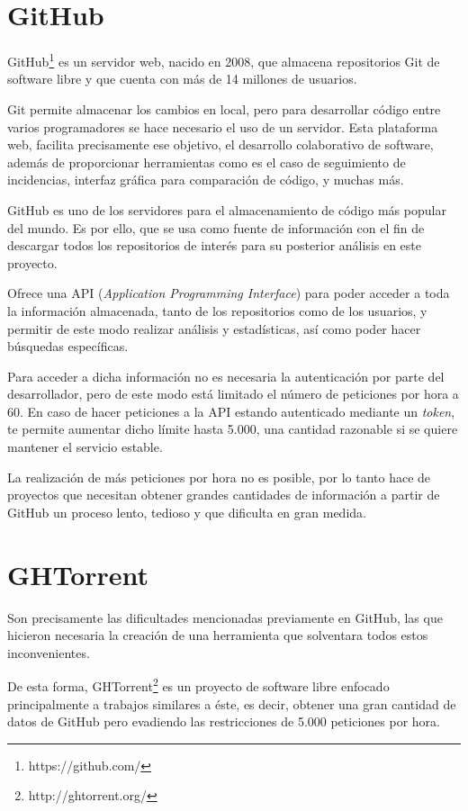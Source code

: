 \documentclass[a4paper, 12pt]{book}
\begin{document}
\section{GitHub} 
\label{sec:seccion6}
GitHub\footnote{https://github.com/} es un servidor web, nacido en 2008, que almacena repositorios Git de software libre y que cuenta con más de 14 millones de usuarios. 

Git permite almacenar los cambios en local, pero para desarrollar código entre varios programadores se hace necesario el uso de un servidor. Esta plataforma web, facilita precisamente ese objetivo, el desarrollo colaborativo de software, además de proporcionar herramientas como es el caso de seguimiento de incidencias, interfaz gráfica para comparación de código, y muchas más.

GitHub es uno de los servidores para el almacenamiento de código más popular del mundo. Es por ello, que se usa como fuente de información con el fin de descargar todos los repositorios de interés para su posterior análisis en este proyecto.

Ofrece una API (\textit{Application Programming Interface}) para poder acceder a toda la información almacenada, tanto de los repositorios como de los usuarios, y permitir de este modo realizar análisis y estadísticas, así como poder hacer búsquedas específicas.

Para acceder a dicha información no es necesaria la autenticación por parte del desarrollador, pero de este modo está limitado el número de peticiones por hora a 60. En caso de hacer peticiones a la API estando autenticado mediante un \textit{token}, te permite aumentar dicho límite hasta 5.000, una cantidad razonable si se quiere mantener el servicio estable.

La realización de más peticiones por hora no es posible, por lo tanto hace de proyectos que necesitan obtener grandes cantidades de información a partir de GitHub un proceso lento, tedioso y que dificulta en gran medida.


\section{GHTorrent} 
\label{sec:seccion7}
Son precisamente las dificultades mencionadas previamente en GitHub, las que hicieron necesaria la creación de una herramienta que solventara todos estos inconvenientes.

De esta forma, GHTorrent\footnote{http://ghtorrent.org/} es un proyecto de software libre enfocado principalmente a trabajos similares a éste, es decir, obtener una gran cantidad de datos de GitHub pero evadiendo las restricciones de 5.000 peticiones por hora. 
\end{document}
